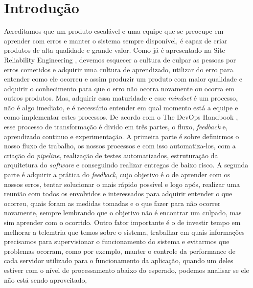 \chapter{Introdução}

  Acreditamos que um produto escalável e uma equipe que se preocupe em aprender
  com erros e manter o sistema sempre disponível, é capaz de criar produtos de
  alta qualidade e grande valor. \newline
  Como já é apresentado na Site Reliability Engineering \cite{SiteReliabilityEngineering},
  devemos esquecer a cultura de culpar as pessoas por erros cometidos e adquirir
  uma cultura de aprendizado, utilizar do erro para entender como ele ocorreu e
  assim produzir um produto com maior qualidade e adquirir o conhecimento para
  que o erro não ocorra novamente ou ocorra em outros produtos. Mas, adquirir essa
  maturidade e esse \textit{mindset} é um processo, não é algo imediato, e é
  necessário entender em qual momento está a equipe e como implementar estes
  processos. \newline
  De acordo com o The DevOps Handbook \cite{TheDevOpsHandbook}, esse processo de
  transformação é divido em três partes, o fluxo, \textit{feedback} e, aprendizado
  continuo e experimentação. A primeira parte é sobre definirmos o nosso fluxo de
  trabalho, os nossos processos e com isso automatiza-los, com a criação do
  \textit{pipeline}, realização de testes automatizados, estruturação da arquitetura
  do \textit{software} e conseguindo realizar entregas de baixo risco. A segunda
  parte é adquirir a prática do \textit{feedback}, cujo objetivo é o de aprender
  com os nossos erros, tentar solucionar o mais rápido possível e logo após, realizar
  uma reunião com todos os envolvidos e interessados para adquirir entender o que
  ocorreu, quais foram as medidas tomadas e o que fazer para não ocorrer novamente,
  sempre lembrando que o objetivo não é encontrar um culpado, mas sim aprender com
  o ocorrido. Outro fator importante é o de investir tempo em melhorar a telemtria
  que temos sobre o sistema, trabalhar em quais informações precisamos para
  supervisionar o funcionamento do sistema e evitarmos que problemas ocorram,
  como por exemplo, manter o controle da performance de cada servidor utilizado
  para o funcionamento da aplicação, quando um deles estiver com o nível de
  processamento abaixo do esperado, podemos analisar se ele não está sendo aproveitado,
